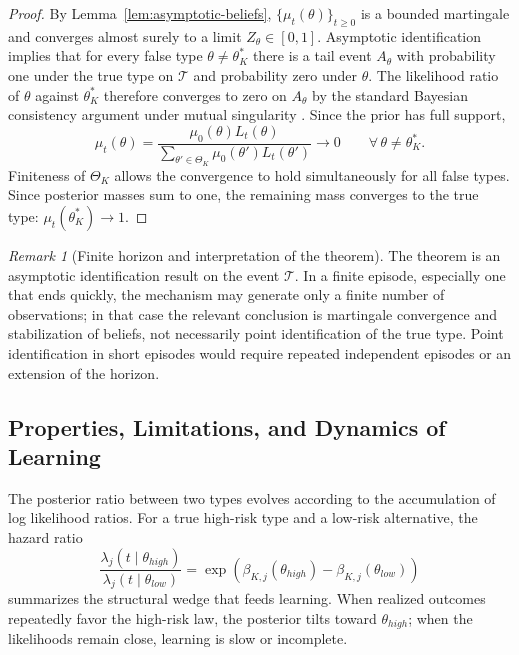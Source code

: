 \documentclass[12pt,a4paper]{article}
\providecommand{\textcite}{\citet}
\theoremstyle{plain}
\theoremstyle{definition}
\theoremstyle{remark}
\newtheorem{remark}[theorem]{Remark}
\newcommand{\1}{\mathbf{1}}
\begin{document}
\begin{proof}
By Lemma~\ref{lem:asymptotic-beliefs}, $\{\mu_t(\theta)\}_{t\ge0}$ is a bounded
martingale and converges almost surely to a limit $Z_\theta\in[0,1]$. Asymptotic
identification implies that for every false type $\theta\neq\theta_K^\ast$ there is a
tail event $A_\theta$ with probability one under the true type on $\mathcal{T}$ and
probability zero under $\theta$. The likelihood ratio of $\theta$ against
$\theta_K^\ast$ therefore converges to zero on $A_\theta$ by the standard Bayesian
consistency argument under mutual singularity \textcite{BlackwellDubins1962,
Schervish1995Theory}. Since the prior has full support,
\[
\mu_t(\theta)
=\frac{\mu_0(\theta)L_t(\theta)}
{\sum_{\theta'\in\Theta_K}\mu_0(\theta')L_t(\theta')}
\longrightarrow0
\qquad\forall\,\theta\neq\theta_K^\ast.
\]
Finiteness of $\Theta_K$ allows the convergence to hold simultaneously for all false
types. Since posterior masses sum to one, the remaining mass converges to the true type:
$\mu_t(\theta_K^\ast)\to1$.
\end{proof}

\begin{remark}[Finite horizon and interpretation of the theorem]
\label{rmk:horizonte-finito-consistencia}
The theorem is an asymptotic identification result on the event $\mathcal{T}$. In a
finite episode, especially one that ends quickly, the mechanism may generate only a
finite number of observations; in that case the relevant conclusion is martingale
convergence and stabilization of beliefs, not necessarily point identification of the
true type. Point identification in short episodes would require repeated independent
episodes or an extension of the horizon.
\end{remark}

\subsection{Properties, Limitations, and Dynamics of Learning}
\label{subsec:learning-properties}

The posterior ratio between two types evolves according to the accumulation of log
likelihood ratios. For a true high-risk type and a low-risk alternative, the hazard
ratio
\begin{equation}
\label{eq:hazard-ratio-tipo}
\frac{\lambda_j(t\mid\theta_{high})}{\lambda_j(t\mid\theta_{low})}
=\exp\!\left(\beta_{K,j}(\theta_{high})-\beta_{K,j}(\theta_{low})\right)
\end{equation}
summarizes the structural wedge that feeds learning. When realized outcomes repeatedly
favor the high-risk law, the posterior tilts toward $\theta_{high}$; when the
likelihoods remain close, learning is slow or incomplete.
\end{document}
